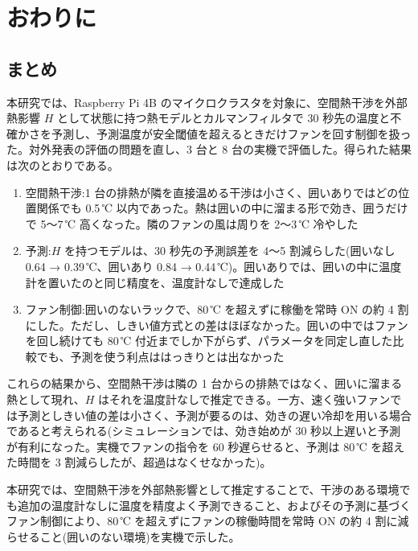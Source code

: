 \chapter{おわりに}\label{chap:conclusion}

\section{まとめ}
本研究では、Raspberry Pi 4B のマイクロクラスタを対象に、空間熱干渉を外部熱影響 $H$ として状態に持つ熱モデルとカルマンフィルタで 30 秒先の温度と不確かさを予測し、予測温度が安全閾値を超えるときだけファンを回す制御を扱った。対外発表の評価の問題を直し、3 台と 8 台の実機で評価した。得られた結果は次のとおりである。

\begin{enumerate}
  \item 空間熱干渉:1 台の排熱が隣を直接温める干渉は小さく、囲いありではどの位置関係でも 0.5\,℃ 以内であった。熱は囲いの中に溜まる形で効き、囲うだけで 5〜7\,℃ 高くなった。隣のファンの風は周りを 2〜3\,℃ 冷やした
  \item 予測:$H$ を持つモデルは、30 秒先の予測誤差を 4〜5 割減らした(囲いなし 0.64 → 0.39\,℃、囲いあり 0.84 → 0.44\,℃)。囲いありでは、囲いの中に温度計を置いたのと同じ精度を、温度計なしで達成した
  \item ファン制御:囲いのないラックで、80\,℃ を超えずに稼働を常時 ON の約 4 割にした。ただし、しきい値方式との差はほぼなかった。囲いの中ではファンを回し続けても 80\,℃ 付近までしか下がらず、パラメータを同定し直した比較でも、予測を使う利点ははっきりとは出なかった
\end{enumerate}

これらの結果から、空間熱干渉は隣の 1 台からの排熱ではなく、囲いに溜まる熱として現れ、$H$ はそれを温度計なしで推定できる。一方、速く強いファンでは予測としきい値の差は小さく、予測が要るのは、効きの遅い冷却を用いる場合であると考えられる(シミュレーションでは、効き始めが 30 秒以上遅いと予測が有利になった。実機でファンの指令を 60 秒遅らせると、予測は 80\,℃ を超えた時間を 3 割減らしたが、超過はなくせなかった)。

本研究では、空間熱干渉を外部熱影響として推定することで、干渉のある環境でも追加の温度計なしに温度を精度よく予測できること、およびその予測に基づくファン制御により、80\,℃ を超えずにファンの稼働時間を常時 ON の約 4 割に減らせること(囲いのない環境)を実機で示した。

